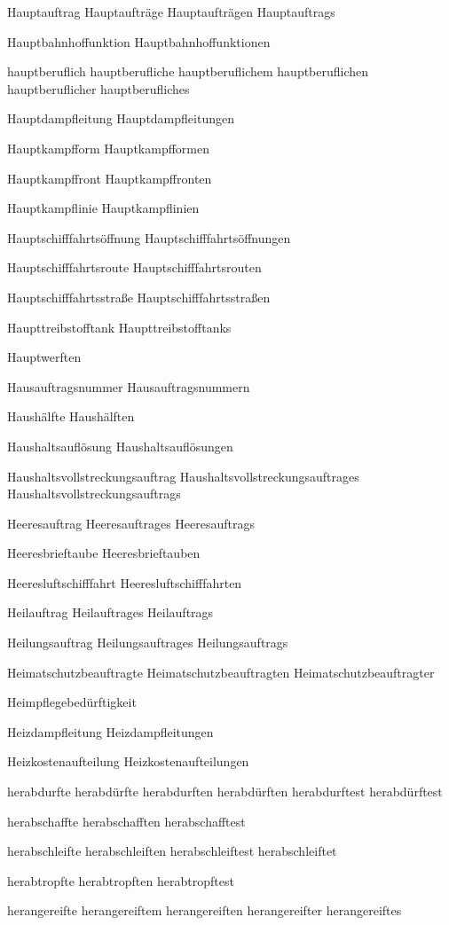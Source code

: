 Hauptauftrag
Hauptaufträge
Hauptaufträgen
Hauptauftrags

Hauptbahnhoffunktion
Hauptbahnhoffunktionen

hauptberuflich
hauptberufliche
hauptberuflichem
hauptberuflichen
hauptberuflicher
hauptberufliches

Hauptdampfleitung
Hauptdampfleitungen

Hauptkampfform
Hauptkampfformen

Hauptkampffront
Hauptkampffronten

Hauptkampflinie
Hauptkampflinien

Hauptschifffahrtsöffnung
Hauptschifffahrtsöffnungen

Hauptschifffahrtsroute
Hauptschifffahrtsrouten

Hauptschifffahrtsstraße
Hauptschifffahrtsstraßen

Haupttreibstofftank
Haupttreibstofftanks

Hauptwerften

Hausauftragsnummer
Hausauftragsnummern

Haushälfte
Haushälften

Haushaltsauflösung
Haushaltsauflösungen

Haushaltsvollstreckungsauftrag
Haushaltsvollstreckungsauftrages
Haushaltsvollstreckungsauftrags

Heeresauftrag
Heeresauftrages
Heeresauftrags

Heeresbrieftaube
Heeresbrieftauben

Heeresluftschifffahrt
Heeresluftschifffahrten

Heilauftrag
Heilauftrages
Heilauftrags

Heilungsauftrag
Heilungsauftrages
Heilungsauftrags

Heimatschutzbeauftragte
Heimatschutzbeauftragten
Heimatschutzbeauftragter

Heimpflegebedürftigkeit

Heizdampfleitung
Heizdampfleitungen

Heizkostenaufteilung
Heizkostenaufteilungen

herabdurfte
herabdürfte
herabdurften
herabdürften
herabdurftest
herabdürftest

herabschaffte
herabschafften
herabschafftest

herabschleifte
herabschleiften
herabschleiftest
herabschleiftet

herabtropfte
herabtropften
herabtropftest

herangereifte
herangereiftem
herangereiften
herangereifter
herangereiftes

